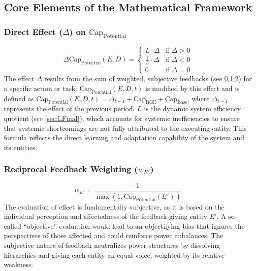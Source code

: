 \documentclass[12pt]{scrartcl}
\begin{document}
\subsection{Core Elements of the Mathematical Framework}

\subsubsection{Direct Effect ($\Delta$) on $\text{Cap}_{\text{Potential}}$}
\label{sec:DeltaCapPotential}
\begin{equation}
\Delta \text{Cap}_{\text{Potential}}(E,D) =
\begin{cases}
L \cdot \Delta & \text{if } \Delta > 0 \\
\frac{1}{L} \cdot \Delta & \text{if } \Delta < 0 \\
0 & \text{if } \Delta = 0
\end{cases}
\label{eq:DeltaCapPotentialFinal}
\end{equation}
The effect $\Delta$ results from the sum of weighted, subjective feedbacks (see \ref{sec:wEFinal}) for a specific action or task. $\text{Cap}_{\text{Potential}}(E,D,t)$ is modified by this effect and is defined as $\text{Cap}_{\text{Potential}}(E,D,t) = \Delta_{t-1} + \text{Cap}_{\text{BGE}} + \text{Cap}_{\text{Base}}$, where $\Delta_{t-1}$ represents the effect of the previous period. $L$ is the dynamic system efficiency quotient (see \ref{sec:LFinal}), which accounts for systemic inefficiencies to ensure that systemic shortcomings are not fully attributed to the executing entity. This formula reflects the direct learning and adaptation capability of the system and its entities.

\subsubsection{Reciprocal Feedback Weighting ($w_{E'}$)}
\label{sec:wEFinal}
\begin{equation}
w_{E'} = \frac{1}{\max(1, \text{Cap}_{\text{Potential}}(E'))}
\label{eq:wEFinal}
\end{equation}
The evaluation of effect is fundamentally subjective, as it is based on the individual perception and affectedness of the feedback-giving entity $E'$. A so-called “objective” evaluation would lead to an objectifying bias that ignores the perspectives of those affected and could reinforce power imbalances. The subjective nature of feedback neutralizes power structures by dissolving hierarchies and giving each entity an equal voice, weighted by its relative weakness.
\end{document}
